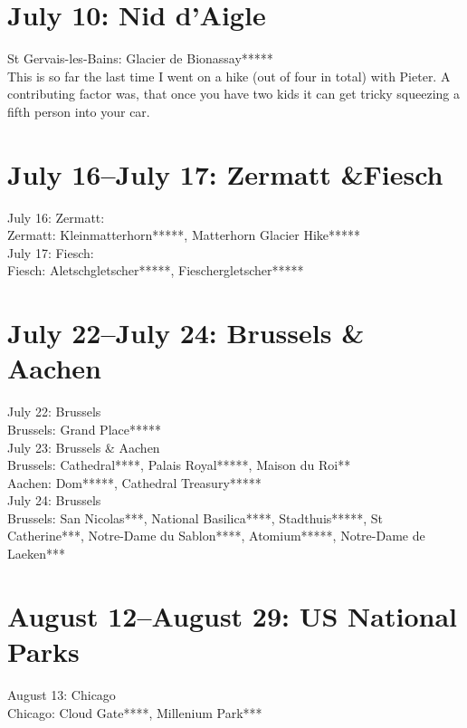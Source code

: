 \section{July 10: Nid d'Aigle}
\label{Niddaigle2016}

St Gervais-les-Bains: Glacier de Bionassay*****\\

This is so far the last time I went on a hike (out of four in total) with Pieter. A contributing factor was, that once you have two kids it can get tricky squeezing a fifth person into your car.\\

\section{July 16--July 17: Zermatt \&Fiesch}
\label{ZermattFiesch2016}

July 16: Zermatt:\\
Zermatt: Kleinmatterhorn*****, Matterhorn Glacier Hike*****\\

July 17: Fiesch:\\
Fiesch: Aletschgletscher*****, Fieschergletscher*****

\section{July 22--July 24: Brussels \& Aachen}
\label{Brussels2016}

July 22: Brussels\\
Brussels: Grand Place*****\\

July 23: Brussels \& Aachen\\
Brussels: Cathedral****, Palais Royal*****, Maison du Roi**\\
Aachen: Dom*****, Cathedral Treasury*****\\

July 24: Brussels\\
Brussels: San Nicolas***, National Basilica****, Stadthuis*****, St Catherine***, Notre-Dame du Sablon****,  Atomium*****, Notre-Dame de Laeken***

\section{August 12--August 29: US National Parks}
\label{US2016}

August 13: Chicago\\
Chicago: Cloud Gate****, Millenium Park***\\

